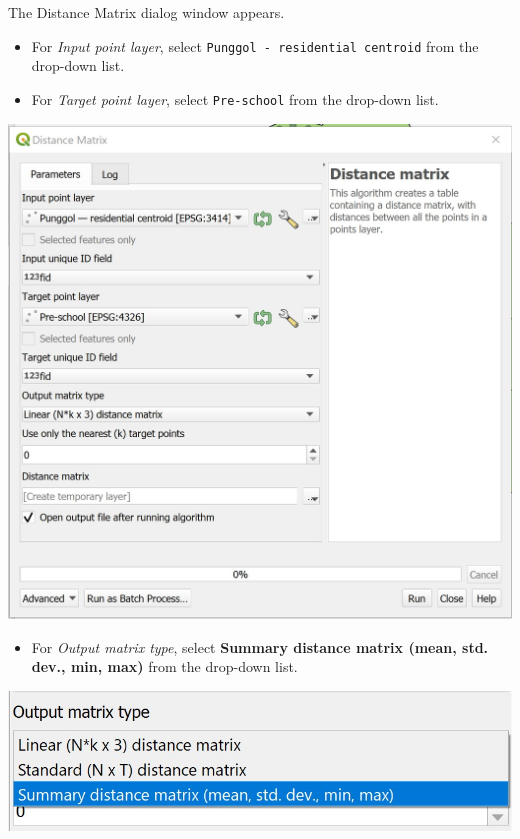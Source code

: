 \documentclass[
  letterpaper,
  DIV=11,
  numbers=noendperiod]{scrreprt}
\providecommand{\tightlist}{%
  \setlength{\itemsep}{0pt}\setlength{\parskip}{0pt}}\usepackage{longtable,booktabs,array}
\begin{document}
The Distance Matrix dialog window appears.

\begin{itemize}
\item
  For \emph{Input point layer}, select
  \texttt{Punggol\ -\ residential\ centroid} from the drop-down list.
\item
  For \emph{Target point layer}, select \texttt{Pre-school} from the
  drop-down list.
\end{itemize}

\includegraphics{./img04/image117.jpg}

\begin{itemize}
\tightlist
\item
  For \emph{Output matrix type}, select \textbf{Summary distance matrix
  (mean, std. dev., min, max)} from the drop-down list.
\end{itemize}

\includegraphics{./img04/image118.jpg}
\end{document}
